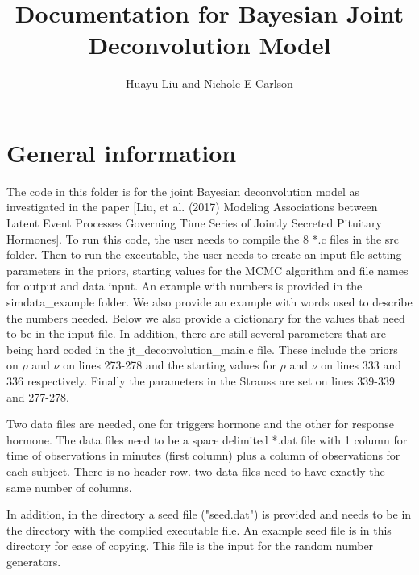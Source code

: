 \documentclass[12pt, oneside]{article}   	%
\begin{document}
\title{Documentation for Bayesian Joint Deconvolution Model}
\author{Huayu Liu and Nichole E Carlson}
\date{}
\maketitle

\section{General information}
The code in this folder is for the joint Bayesian deconvolution model as investigated in the paper [Liu, et al. (2017) Modeling Associations between Latent Event Processes Governing Time Series of Jointly Secreted Pituitary Hormones].  To run this code, the user needs to compile the 8 *.c files in the src folder. Then to run the executable, the user needs to create an input file setting parameters in the priors, starting values for the MCMC algorithm and file names for output and data input. An example with numbers is provided in the simdata\_example folder. We also provide an example with words used to describe the numbers needed. Below we also provide a dictionary for the values that need to be in the input file.  In addition, there are still several parameters that are being hard coded in the jt\_deconvolution\_main.c file.  These include the priors on $\rho$ and $\nu$ on lines 273-278 and the starting values for $\rho$ and $\nu$ on lines 333 and 336 respectively. Finally the parameters in the Strauss are set on lines 339-339 and 277-278. 

Two data files are needed, one for triggers hormone and the other for response hormone. The data files need to be a space delimited *.dat file with 1 column for time of observations in minutes (first column) plus a column of observations for each subject. There is no header row. two data files need to have exactly the same number of columns.

In addition, in the directory a seed file ("seed.dat") is provided and needs to be in the directory with the complied executable file.  An example seed file is in this directory for ease of copying.  This file is the input for the random number generators.
\end{document}

